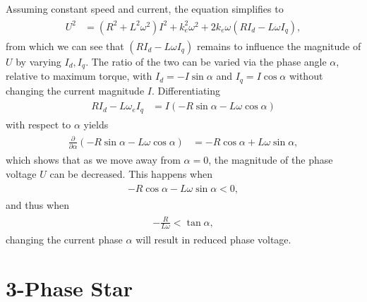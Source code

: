 \documentclass[12pt,a4paper,oneside,openany]{article}
\begin{document}
Assuming constant speed and current, the equation simplifies to
\begin{gather}
\begin{aligned}
U^2 &= \left(R^2 + L^2 \omega^2 \right) I^2 + k_e^2 \omega^2  + 2 k_e \omega \left( R I_d - L \omega I_q \right),
\end{aligned}
\end{gather}
from which we can see that $\left( R I_d - L \omega I_q \right)$ remains to influence the magnitude of $U$ by varying $I_d, I_q$. The ratio of the two can be varied via the phase angle $\alpha$, relative to maximum torque, with $I_d = - I \sin \alpha$ and $I_q = I \cos \alpha$ without changing the current magnitude $I$. Differentiating 
\begin{gather}
\begin{aligned}
R I_d - L \omega_e I_q &= I \left( - R \sin \alpha - L \omega \cos \alpha \right)
\end{aligned}
\end{gather}
with respect to $\alpha$ yields
\begin{gather}
\begin{aligned}
\frac{\partial}{\partial \alpha} \left(- R \sin \alpha - L \omega \cos \alpha \right) &= - R \cos \alpha + L \omega \sin \alpha,
\end{aligned}
\end{gather}
which shows that as we move away from $\alpha = 0$, the magnitude of the phase voltage $U$ can be decreased. This happens when
\begin{gather}
\begin{aligned}
- R \cos \alpha - L \omega \sin \alpha < 0,
\end{aligned}
\end{gather}
and thus when
\begin{gather}
\begin{aligned}
- \frac{R}{L \omega} < \tan \alpha,
\end{aligned}
\end{gather}
changing the current phase $\alpha$ will result in reduced phase voltage.

\section{3-Phase Star}
\end{document}
